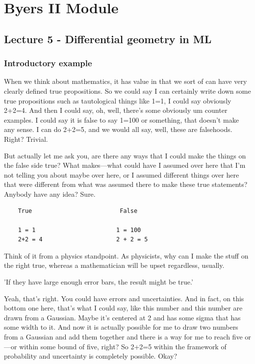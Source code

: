 \chapter{Byers II Module}


\section{Lecture 5 - Differential geometry in ML}

\subsection{Introductory example}

When we think about mathematics, it has value in that we sort of can have very clearly defined true propositions. So we could say I can certainly write down some true propositions such as tautological things like 1=1, I could say obviously 2+2=4. And then I could say, oh, well, there's some obviously um counter examples. I could say it is false to say 1=100 or something, that doesn't make any sense. I can do 2+2=5, and we would all say, well, these are falsehoods. Right? Trivial. 

But actually let me ask you, are there any ways that I could make the things on the false side true? What makes—what could have I assumed over here that I'm not telling you about maybe over here, or I assumed different things over here that were different from what was assumed there to make these true statements? Anybody have any idea? Sure.




\begin{centering}
\begin{verbatim}
    True                         False

    1 = 1                       1 = 100
    2+2 = 4                     2 + 2 = 5
\end{verbatim}
\end{centering}
Think of it from a physics standpoint. As physicists, why can I make the stuff on the right true, whereas a mathematician will be upset regardless, usually.

'If they have large enough error bars, the result might be true.'

Yeah, that's right. You could have errors and uncertainties. And in fact, on this bottom one here, that's what I could say, like this number and this number are drawn from a Gaussian. Maybe it's centered at 2 and has some sigma that has some width to it. And now it is actually possible for me to draw two numbers from a Gaussian and add them together and there is a way for me to reach five or—or within some bound of five, right? So 2+2=5 within the framework of probability and uncertainty is completely possible. Okay? 

